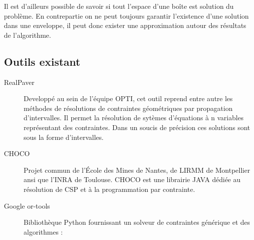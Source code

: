  Il est d'ailleurs possible de savoir si tout l'espace d'une boîte est solution du problème. En contrepartie on ne peut toujours garantir l'existence d'une solution dans une enveloppe, il peut donc exister une approximation autour des résultats de l'algorithme.
 \clearpage
 
 \subsection{Outils existant}
\begin{description}
 \item [RealPaver]
Developpé  au sein de l'équipe OPTI, cet outil reprend entre autre les méthodes de résolutions de contraintes géométriques par propagation d'intervalles. Il permet la résolution de sytèmes d'équations à n variables représentant des contraintes. Dans un soucis de précision ces solutions sont sous la forme d'intervalles. \cite{realpaver}
\item [CHOCO]  Projet commun  de l'École des Mines de Nantes, de LIRMM de Montpellier ansi que l'INRA de Toulouse. CHOCO est une librairie  JAVA  dédiée au résolution de CSP et à la programmation par contrainte. \cite{choco}
 

\item [Google or-tools]
 Bibliothèque Python fournissant un solveur de contraintes générique et des algorithmes : \cite{ortools}



\end{description}
